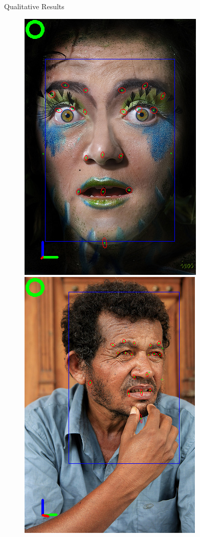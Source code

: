 \documentclass{beamer}
\begin{document}
\begin{frame}{Qualitative Results}
\begin{figure}
\iffalse
\includegraphics[scale=0.22]{fig/mean_example_pres4}
\includegraphics[scale=0.22]{fig/mean_example_pres2}

\end{figure}
\end{frame}
\end{document}
